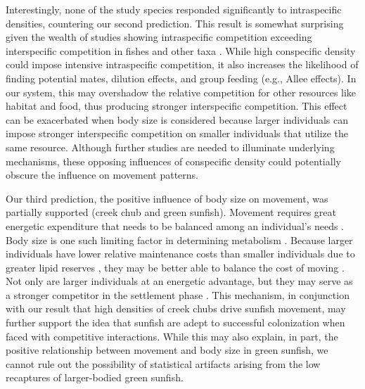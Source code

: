 \documentclass[11pt, class=article, crop=false]{standalone}
\begin{document}
Interestingly, none of the study species responded significantly to intraspecific densities, countering our second prediction. This result is somewhat surprising given the wealth of studies showing intraspecific competition exceeding interspecific competition in fishes \citep{websterMechanismsIndividualConsequences2000, wardIntraspecificFoodCompetition2006} and other taxa \citep{adlerCompetitionCoexistencePlant2018, barabasEffectIntraInterspecific2016, thompsonProcessbasedMetacommunityFramework2020, chessonRolesHarshFluctuating1997, tilmanResourceCompetitionCommunity1982, mcpeekIntraspecificDensityDependence2012}. While high conspecific density could impose intensive intraspecific competition, it also increases the likelihood of finding potential mates, dilution effects, and group feeding (e.g., Allee effects)\citep{teruiCrypticAlleeEffect2015}. In our system, this may overshadow the relative competition for other resources like habitat and food, thus producing stronger interspecific competition. This effect can be exacerbated when body size is considered because larger individuals can impose stronger interspecific competition on smaller individuals that utilize the same resource. Although further studies are needed to illuminate underlying mechanisms, these opposing influences of conspecific density could potentially obscure the influence on movement patterns. 

Our third prediction, the positive influence of body size on movement, was partially supported (creek chub and green sunfish). Movement requires great energetic expenditure that needs to be balanced among an individual’s needs \citep{boisclairImportanceActivityBioenergetics1989, joblingBioenergeticsFeedIntake1993, cookeMovementEcologyFishes2022}. Body size is one such limiting factor in determining metabolism \citep{beamish2SwimmingCapacity1978, rubio-graciaSizerelatedEffectsInfluence2020}. Because larger individuals have lower relative maintenance costs than smaller individuals due to greater lipid reserves \citep{brownSizeMattersTest2004, krauseRefugeUseFish1998, kannoBodyConditionMetrics}, they may be better able to balance the cost of moving \citep{schlagelMovementmediatedCommunityAssembly2020}. Not only are larger individuals at an energetic advantage, but they may serve as a stronger competitor in the settlement phase \citep{rasmussenIndividualMovementStream2017}. This mechanism, in conjunction with our result that high densities of creek chubs drive sunfish movement, may further support the idea that sunfish are adept to successful colonization when faced with competitive interactions. While this may also explain, in part, the positive relationship between movement and body size in green sunfish, we cannot rule out the possibility of statistical artifacts arising from the low recaptures of larger-bodied green sunfish. 
\end{document}
